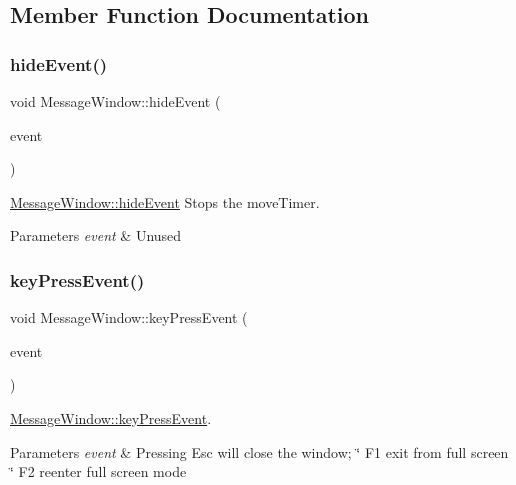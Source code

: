\subsection{Member Function Documentation}
\mbox{\label{classMessageWindow_aec91ce8e6e2ad404dc79f141fa9ce7b0}} 
\subsubsection{\texorpdfstring{hide\+Event()}{hideEvent()}}
{\footnotesize\ttfamily void Message\+Window\+::hide\+Event (\begin{DoxyParamCaption}\item[{Q\+Hide\+Event $\ast$}]{event }\end{DoxyParamCaption})}



\mbox{\hyperlink{classMessageWindow_aec91ce8e6e2ad404dc79f141fa9ce7b0}{Message\+Window\+::hide\+Event}} Stops the move\+Timer. 


\begin{DoxyParams}{Parameters}
{\em event} & Unused \\
\hline
\end{DoxyParams}
\mbox{\label{classMessageWindow_adc919ddd8974835eb9f44d9cd5362f18}} 
\subsubsection{\texorpdfstring{key\+Press\+Event()}{keyPressEvent()}}
{\footnotesize\ttfamily void Message\+Window\+::key\+Press\+Event (\begin{DoxyParamCaption}\item[{Q\+Key\+Event $\ast$}]{event }\end{DoxyParamCaption})}



\mbox{\hyperlink{classMessageWindow_adc919ddd8974835eb9f44d9cd5362f18}{Message\+Window\+::key\+Press\+Event}}. 


\begin{DoxyParams}{Parameters}
{\em event} & Pressing Esc will close the window; \char`\"{}    F1  exit from full screen
    \char`\"{} F2 reenter full screen mode \\
\hline
\end{DoxyParams}
\mbox{\label{classMessageWindow_ad3b6dcb371660e6a3e0ded36564afafa}} 
